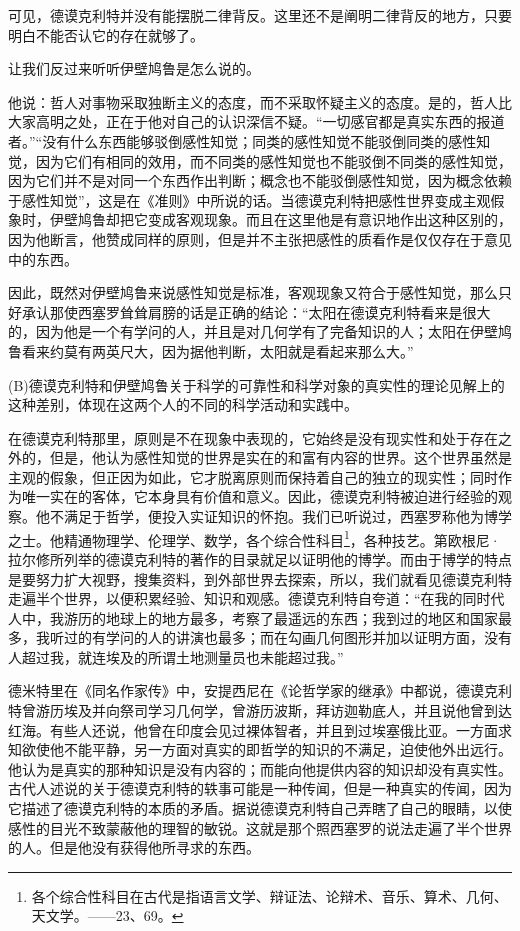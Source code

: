 \documentclass[a4paper,twoside,12pt,AutoFakeBold]{ctexart}
\begin{document}
可见，德谟克利特并没有能摆脱二律背反。这里还不是阐明二律背反的地方，只要明白不能否认它的存在就够了。

 让我们反过来听听伊壁鸠鲁是怎么说的。

他说：哲人对事物采取独断主义的态度，而不采取怀疑主义的态度。是的，哲人比大家高明之处，正在于他对自己的认识深信不疑。“一切感官都是真实东西的报道者。”“没有什么东西能够驳倒感性知觉；同类的感性知觉不能驳倒同类的感性知觉，因为它们有相同的效用，而不同类的感性知觉也不能驳倒不同类的感性知觉，因为它们并不是对同一个东西作出判断；概念也不能驳倒感性知觉，因为概念依赖于感性知觉”，这是在《准则》中所说的话。当德谟克利特把感性世界变成主观假象时，伊壁鸠鲁却把它变成客观现象。而且在这里他是有意识地作出这种区别的，因为他断言，他赞成同样的原则，但是并不主张把感性的质看作是仅仅存在于意见中的东西。

因此，既然对伊壁鸠鲁来说感性知觉是标准，客观现象又符合于感性知觉，那么只好承认那使西塞罗耸耸肩膀的话是正确的结论：“太阳在德谟克利特看来是很大的，因为他是一个有学问的人，并且是对几何学有了完备知识的人；太阳在伊壁鸠鲁看来约莫有两英尺大，因为据他判断，太阳就是看起来那么大。”

(B)德谟克利特和伊壁鸠鲁关于科学的可靠性和科学对象的真实性的理论见解上的这种差别，体现在这两个人的不同的科学活动和实践中。

在德谟克利特那里，原则是不在现象中表现的，它始终是没有现实性和处于存在之外的，但是，他认为感性知觉的世界是实在的和富有内容的世界。这个世界虽然是主观的假象，但正因为如此，它才脱离原则而保持着自己的独立的现实性；同时作为唯一实在的客体，它本身具有价值和意义。因此，德谟克利特被迫进行经验的观察。他不满足于哲学，便投入实证知识的怀抱。我们已听说过，西塞罗称他为博学之士。他精通物理学、伦理学、数学，各个综合性科目\footnote{各个综合性科目在古代是指语言文学、辩证法、论辩术、音乐、算术、几何、天文学。——23、69。}，各种技艺。第欧根尼·拉尔修所列举的德谟克利特的著作的目录就足以证明他的博学。而由于博学的特点是要努力扩大视野，搜集资料，到外部世界去探索，所以，我们就看见德谟克利特走遍半个世界，以便积累经验、知识和观感。德谟克利特自夸道：“在我的同时代人中，我游历的地球上的地方最多，考察了最遥远的东西；我到过的地区和国家最多，我听过的有学问的人的讲演也最多；而在勾画几何图形并加以证明方面，没有人超过我，就连埃及的所谓土地测量员也未能超过我。”

德米特里在《同名作家传》中，安提西尼在《论哲学家的继承》中都说，德谟克利特曾游历埃及并向祭司学习几何学，曾游历波斯，拜访迦勒底人，并且说他曾到达红海。有些人还说，他曾在印度会见过裸体智者，并且到过埃塞俄比亚。一方面求知欲使他不能平静，另一方面对真实的即哲学的知识的不满足，迫使他外出远行。他认为是真实的那种知识是没有内容的；而能向他提供内容的知识却没有真实性。古代人述说的关于德谟克利特的轶事可能是一种传闻，但是一种真实的传闻，因为它描述了德谟克利特的本质的矛盾。据说德谟克利特自己弄瞎了自己的眼睛，以使感性的目光不致蒙蔽他的理智的敏锐。这就是那个照西塞罗的说法走遍了半个世界的人。但是他没有获得他所寻求的东西。
\end{document}
